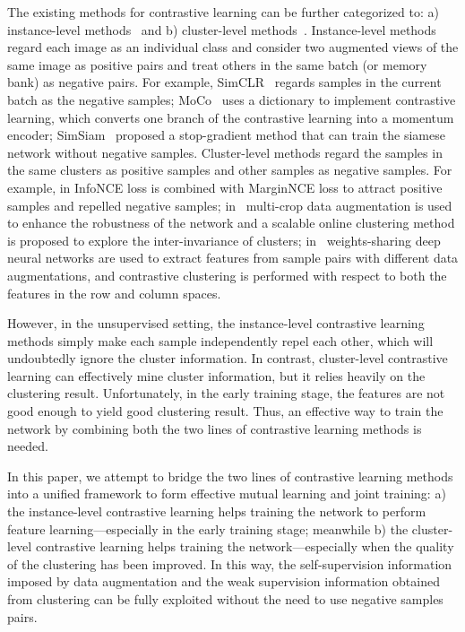 \documentclass[journal]{IEEEtran}
\begin{document}
The existing methods for contrastive learning can be further categorized to: 
a) instance-level methods~\cite{Chen:ICLR20,Chen:arxiv20,bojanowski:ICML17,dosovitskiy:PAMI15,Larochelle:NIPS2020} and 
b) cluster-level methods~\cite{Caron:arxiv20,Xie:NIPS20,Li:AAAI2021}. 
Instance-level methods regard each image as an individual class and 
consider two augmented views of the same image as positive pairs and treat others in the same batch (or memory bank) as negative pairs. 
For example, SimCLR~\cite{Chen:ICLR20} regards samples in the current batch as the negative samples;  MoCo~\cite{He:CVPR20} uses {a dictionary} 
to implement contrastive learning, which converts one branch of the contrastive learning into a momentum encoder; SimSiam~\cite{Chen:arxiv20} proposed a stop-gradient method that can train the siamese network without negative samples.
Cluster-level methods regard the samples in the same clusters as positive samples and other samples as negative samples. For example, in \cite{Xie:NIPS20} InfoNCE loss is combined with MarginNCE loss to attract positive samples and repelled negative samples; in~\cite{Caron:arxiv20} multi-crop data augmentation is used to enhance the robustness of the network and a scalable online clustering method is proposed 
to explore the inter-invariance of clusters; in~\cite{Li:AAAI2021} weights-sharing deep neural networks are used to extract features from sample pairs with different data augmentations, and contrastive clustering is performed with respect to both the features in the row and column spaces. 




However, in the unsupervised setting, the instance-level contrastive learning methods simply make each sample independently repel each other, which will undoubtedly ignore the cluster information. In contrast, cluster-level contrastive learning can effectively mine cluster information, but it relies heavily on the clustering result. Unfortunately, in the early training stage, the features are not good enough to yield good clustering result. Thus, an effective way to train the network by combining both the two lines of contrastive learning methods is needed. 


In this paper, we attempt to bridge the two lines of contrastive learning methods into a unified framework to form effective mutual learning and joint training: a) the instance-level contrastive learning helps training the network to perform 
feature learning---especially in the early training stage; meanwhile b) the cluster-level contrastive learning helps training the network---especially when the quality of the clustering has been improved. In this way, the self-supervision information imposed by data augmentation and the weak supervision information obtained from clustering can be fully exploited without the need to use negative samples pairs.
\end{document}
